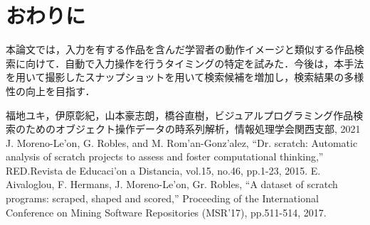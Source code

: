 \documentclass[uplatex,dvipdfmx,a4paper,twocolumn,base=11pt,jbase=11pt,ja=standard]{bxjsarticle}  %
\begin{document}
%


\section{おわりに}

本論文では，入力を有する作品を含んだ学習者の動作イメージと類似する作品検索に向けて．自動で入力操作を行うタイミングの特定を試みた．今後は，本手法を用いて撮影したスナップショットを用いて検索候補を増加し，検索結果の多様性の向上を目指す．



\begin{thebibliography}{1}
   福地ユキ，伊原彰紀，山本豪志朗，橋谷直樹，ビジュアルプログラミング作品検索のためのオブジェクト操作データの時系列解析，情報処理学会関西支部, 2021
   J. Moreno-Le'on, G. Robles, and M. Rom'an-Gonz'alez, ``Dr. scratch: Automatic analysis of scratch projects to assess and foster computational thinking,'' RED.Revista de Educaci'on a Distancia, vol.15, no.46, pp.1-23, 2015.
   E. Aivaloglou, F. Hermans, J. Moreno-Le'on, Gr. Robles, ``A dataset of scratch programs: scraped, shaped and scored,'' Proceeding of the International Conference on Mining Software Repositories (MSR'17), pp.511-514, 2017.

\end{thebibliography}





%
\end{document}
